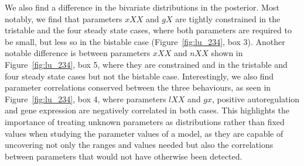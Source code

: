 We also find a difference in the bivariate distributions in the posterior. Most notably, we find that parameters $xXX$ and $gX$ are tightly constrained in the tristable and the four steady state cases, where both parameters are required to be small, but less so in the bistable case (Figure~\ref{fig:lu_234}, box 3). Another notable difference is between parameters $xXX$ and $nXX$ shown in Figure~\ref{fig:lu_234}, box 5, where they are constrained and in the tristable and four steady state cases but not the bistable case. Interestingly, we also find parameter correlations conserved between the three behaviours, as seen in Figure~\ref{fig:lu_234}, box 4, where parameters $lXX$ and $gx$, positive autoregulation and gene expression are negatively correlated in both cases.  This highlights the importance of treating unknown parameters as distributions rather than fixed values when studying the parameter values of a model, as they are capable of uncovering not only the ranges and values needed but also the correlations between parameters that would not have otherwise been detected. 









